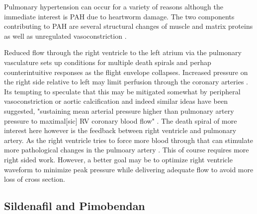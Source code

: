 Pulmonary hypertension can occur for a variety of reasons
\cite{Akabane_Sato_Sakatani_Pharmacokinetics_single_dose_2020}
although the immediate interest is PAH due to heartworm damage.
The two components contributing to PAH are several structural changes
of muscle and matrix proteins as well as unregulated vasoconstriction 
\cite{Lyle_Davis_Brozovich_Regulation_Pulmonary_Vascular_2017}.

Reduced flow through the right ventricle to the left atrium
via the pulmonary vasculature sets up conditions for multiple death
spirals and perhap counterintuitive responses as the flight  
envelope collapses. Increased pressure on the right side 
relative to left may limit
perfusion through the coronary arteries
\cite{Crystal_Pagel_Right_Ventricular_Perfusion_2018}
. Its tempting to speculate
that  this may
be mitigated somewhat by peripheral vasoconstriction or 
aortic calcification and indeed similar ideas have been suggested,
"sustaining mean arterial pressure higher than pulmonary artery 
pressure to maximal[sic] RV coronary
blood flow"
\cite{Pinsky_right_ventricle_interaction_2016}.
The death spiral of more interest here however is the feedback
between right ventricle and pulmonary artery. As the right ventricle
tries to force more blood through that can stimulate more 
pathological changes in the pulmoary artery
\cite{Mirani_Dauz_Yazaki_Right_Ventricular_Stiffening_2025}.
This of course requires more right sided work.  
However, a better goal may be to optimize right ventricle waveform
to minimize peak pressure while delivering adequate flow to avoid
more loss of cross section. 


\subsection{Sildenafil and Pimobendan}

